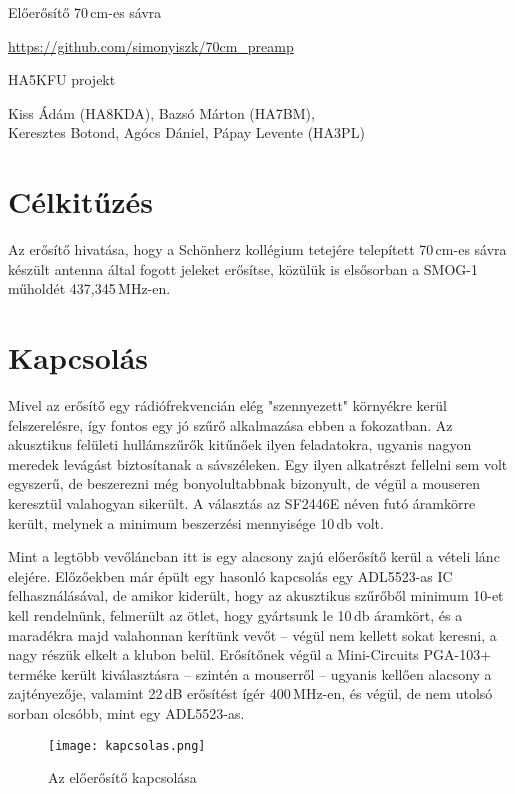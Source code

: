 \begin{center}
	
	\Huge
	Előerősítő 70\,cm-es sávra
	
	\Large
	\url{https://github.com/simonyiszk/70cm_preamp}
	
	\Large
	HA5KFU projekt
	
	\Large
	Kiss Ádám (HA8KDA), Bazsó Márton (HA7BM), \\ Keresztes Botond, Agócs Dániel, Pápay Levente (HA3PL)
\end{center}


\section*{Célkitűzés}

Az erősítő hivatása, hogy a Schönherz kollégium tetejére telepített 70\,cm-es sávra készült antenna által fogott jeleket erősítse, közülük is elsősorban a SMOG-1 műholdét 437,345\,MHz-en.


\section*{Kapcsolás}

Mivel az erősítő egy rádiófrekvencián elég "szennyezett" környékre kerül felszerelésre, így fontos egy jó szűrő alkalmazása ebben a fokozatban. Az akusztikus felületi hullámszűrők kitűnőek ilyen feladatokra, ugyanis nagyon meredek levágást biztosítanak a sávszéleken. Egy ilyen alkatrészt fellelni sem volt egyszerű, de beszerezni még bonyolultabbnak bizonyult, de végül a mouseren keresztül valahogyan sikerült. A választás az SF2446E\cite{SAW} néven futó áramkörre került, melynek a minimum beszerzési mennyisége 10\,db volt.

Mint a legtöbb vevőláncban itt is egy alacsony zajú előerősítő kerül a vételi lánc elejére. Előzőekben már épült egy hasonló kapcsolás egy ADL5523-as IC felhasználásával, de amikor kiderült, hogy az akusztikus szűrőből minimum 10-et kell rendelnünk, felmerült az ötlet, hogy gyártsunk le 10\,db áramkört, és a maradékra majd valahonnan kerítünk vevőt -- végül nem kellett sokat keresni, a nagy részük elkelt a klubon belül. Erősítőnek végül a Mini-Circuits PGA-103+\cite{PGA} terméke került kiválasztásra -- szintén a mouserről -- ugyanis kellően alacsony a zajtényezője, valamint 22\,dB erősítést ígér 400\,MHz-en, és végül, de nem utolsó sorban olcsóbb, mint egy ADL5523-as.

\begin{figure}[!ht]
	\centering
	\texttt{[image: kapcsolas.png]}
	\caption{Az előerősítő kapcsolása}
	\label{fig:LNA_sch}
\end{figure}

